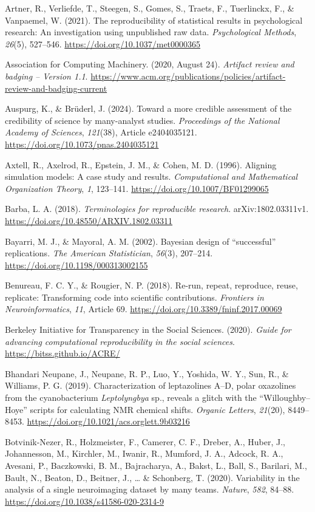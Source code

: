 \documentclass[authordate, meta]{jote-new-article}
\begin{document}
	Artner, R., Verliefde, T., Steegen, S., Gomes, S., Traets, F., Tuerlinckx, F., \& Vanpaemel, W. (2021). The reproducibility of statistical results in psychological research: An investigation using unpublished raw data. \emph{Psychological Methods}, \emph{26}(5), 527--546. \url{https://doi.org/10.1037/met0000365}


	Association for Computing Machinery. (2020, August 24). \emph{Artifact review and badging -- Version 1.1}. \url{https://www.acm.org/publications/policies/artifact-review-and-badging-current}


	Auspurg, K., \& Brüderl, J. (2024). Toward a more credible assessment of the credibility of science by many-analyst studies. \emph{Proceedings of the National Academy of Sciences}, \emph{121}(38), Article e2404035121. \url{https://doi.org/10.1073/pnas.2404035121}


	Axtell, R., Axelrod, R., Epstein, J. M., \& Cohen, M. D. (1996). Aligning simulation models: A case study and results. \emph{Computational and Mathematical Organization Theory}, \emph{1}, 123--141. \url{https://doi.org/10.1007/BF01299065}


	Barba, L. A. (2018). \emph{Terminologies for reproducible research}. arXiv:1802.03311v1. \url{https://doi.org/10.48550/ARXIV.1802.03311}


	Bayarri, M. J., \& Mayoral, A. M. (2002). Bayesian design of “successful” replications. \emph{The American Statistician}, \emph{56}(3), 207--214. \url{https://doi.org/10.1198/000313002155}


	Benureau, F. C. Y., \& Rougier, N. P. (2018). Re-run, repeat, reproduce, reuse, replicate: Transforming code into scientific contributions. \emph{Frontiers in Neuroinformatics}, \emph{11}, Article 69. \url{https://doi.org/10.3389/fninf.2017.00069}


	Berkeley Initiative for Transparency in the Social Sciences. (2020). \emph{Guide for advancing computational reproducibility in the social sciences}. \url{https://bitss.github.io/ACRE/}


	Bhandari Neupane, J., Neupane, R. P., Luo, Y., Yoshida, W. Y., Sun, R., \& Williams, P. G. (2019). Characterization of leptazolines A--D, polar oxazolines from the cyanobacterium \emph{Leptolyngbya} sp., reveals a glitch with the “Willoughby--Hoye” scripts for calculating NMR chemical shifts. \emph{Organic Letters}, \emph{21}(20), 8449--8453. \url{https://doi.org/10.1021/acs.orglett.9b03216}


	Botvinik-Nezer, R., Holzmeister, F., Camerer, C. F., Dreber, A., Huber, J., Johannesson, M., Kirchler, M., Iwanir, R., Mumford, J. A., Adcock, R. A., Avesani, P., Baczkowski, B. M., Bajracharya, A., Bakst, L., Ball, S., Barilari, M., Bault, N., Beaton, D., Beitner, J., … \& Schonberg, T. (2020). Variability in the analysis of a single neuroimaging dataset by many teams. \emph{Nature}, \emph{582}, 84--88. \url{https://doi.org/10.1038/s41586-020-2314-9}
\end{document}
